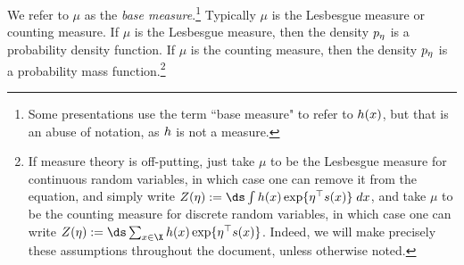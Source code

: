 \begin{definition}
We refer to $\mu$ as the \textit{base measure}.\footnote{Some presentations use the term ``base measure" to refer to $h(x)$, but that is an abuse of notation, as $h$ is not a measure.}  Typically $\mu$ is the Lesbesgue measure or counting measure.  If $\mu$ is the Lesbesgue measure, then the density $p_\eta$ is a probability density function.  If $\mu$ is the counting measure, then the density $p_\eta$ is a probability mass function.\footnote{If measure theory is off-putting, just take $\mu$ to be the Lesbesgue measure for continuous random variables, in which case one can remove it from the equation, and simply write $\normalizerFunction(\naturalParam) := \ds\int  \carrierDensity(x) \exp \{ \naturalParam^\top \sufficientStatsFunction (x)  \} \; dx $, and take $\mu$ to be the counting measure for discrete random variables, in which case one can write $\normalizerFunction(\naturalParam) := \ds\sum_{x \in \X} \carrierDensity(x) \exp \{ \naturalParam^\top \sufficientStatsFunction(x)  \} $. Indeed, we will make precisely these assumptions throughout the document, unless otherwise noted. }  %
\label{def:exponential_family}
\end{definition} 
